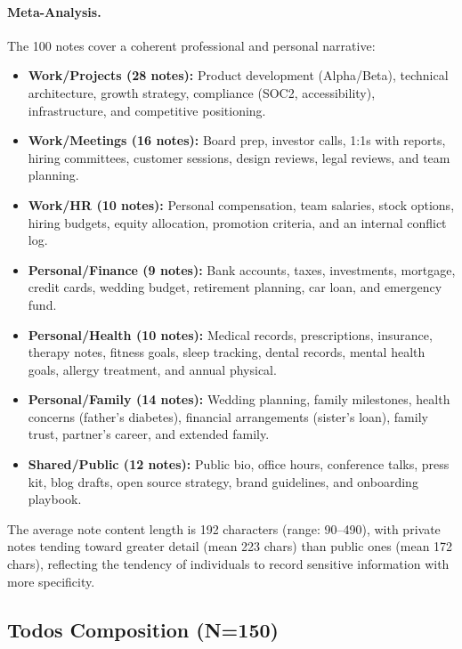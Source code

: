 \paragraph{Meta-Analysis.}
The 100 notes cover a coherent professional and personal narrative:

\begin{itemize}[nosep]
    \item \textbf{Work/Projects (28 notes):} Product development (Alpha/Beta), technical architecture, growth strategy, compliance (SOC2, accessibility), infrastructure, and competitive positioning.
    \item \textbf{Work/Meetings (16 notes):} Board prep, investor calls, 1:1s with reports, hiring committees, customer sessions, design reviews, legal reviews, and team planning.
    \item \textbf{Work/HR (10 notes):} Personal compensation, team salaries, stock options, hiring budgets, equity allocation, promotion criteria, and an internal conflict log.
    \item \textbf{Personal/Finance (9 notes):} Bank accounts, taxes, investments, mortgage, credit cards, wedding budget, retirement planning, car loan, and emergency fund.
    \item \textbf{Personal/Health (10 notes):} Medical records, prescriptions, insurance, therapy notes, fitness goals, sleep tracking, dental records, mental health goals, allergy treatment, and annual physical.
    \item \textbf{Personal/Family (14 notes):} Wedding planning, family milestones, health concerns (father's diabetes), financial arrangements (sister's loan), family trust, partner's career, and extended family.
    \item \textbf{Shared/Public (12 notes):} Public bio, office hours, conference talks, press kit, blog drafts, open source strategy, brand guidelines, and onboarding playbook.
\end{itemize}

The average note content length is 192 characters (range: 90--490), with private notes tending toward greater detail (mean 223 chars) than public ones (mean 172 chars), reflecting the tendency of individuals to record sensitive information with more specificity.

\subsection{Todos Composition (N=150)}
\label{sec:todos-composition}

